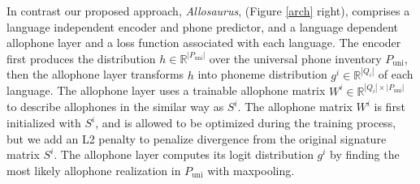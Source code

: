 \documentclass{article}
\newcommand{\gn}[1]{\textcolor{magenta}{\small [#1 --GN]}}
\begin{document}
In contrast our proposed approach, \emph{Allosaurus},  (Figure \ref{arch} right), comprises a language independent encoder and phone predictor, and a language dependent allophone layer and a loss function associated with each language. The encoder first produces the distribution $h \in \mathbb{R}^{|P_{\text{uni}}|}$ over the universal phone inventory $P_{\text{uni}}$, then the allophone layer transforms $h$ into phoneme distribution $g^i \in \mathbb{R}^{|Q_{i}|}$ of each language. 
The allophone layer uses a trainable allophone matrix $W^i \in \mathbb{R}^{|Q_i| \times |P_{\text{uni}}|}$ to describe allophones in the similar way as $S^i$. The allophone matrix $W^i$ is first initialized with $S^i$, and is allowed to be optimized during the training process, but we add an L2 penalty to penalize divergence from the original signature matrix $S^i$. The allophone layer computes its logit distribution $g^i$ by finding the most likely allophone realization in $P_{\text{uni}}$ with maxpooling. %





\end{document}
